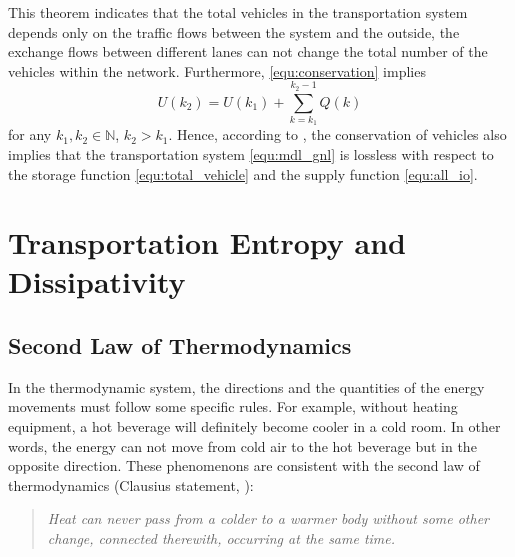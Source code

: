 \documentclass[preprint,authoryear,12pt]{elsarticle}
\begin{document}
This theorem indicates that the total vehicles in the transportation
system depends only on the traffic flows between the system and the
outside, the exchange flows between different lanes can not change
the total number of the vehicles within the network. Furthermore,
\eqref{equ:conservation} implies
\begin{equation}\label{equ:conservation_ex}
U(k_2) = U(k_1)+\sum_{k=k_1}^{k_2-1}Q(k)
\end{equation}
for any $k_1,k_2\in\mathbb{N}$, $k_2>k_1$. Hence, according to
\citep{willems_dissipative_1972-1}, the conservation of vehicles also
implies that the transportation system \eqref{equ:mdl_gnl} is
lossless with respect to the storage function
\eqref{equ:total_vehicle} and the supply function \eqref{equ:all_io}.

\section{Transportation Entropy and Dissipativity}\label{sec:entropy}

\subsection{Second Law of Thermodynamics}

In the thermodynamic system, the directions and the quantities of the
energy movements must follow some specific rules. For example,
without heating equipment, a hot beverage will definitely become
cooler in a cold room. In other words, the energy can not move from
cold air to the hot beverage but in the opposite direction. These
phenomenons are consistent with the second law of thermodynamics
(Clausius statement, \citet{clausius_mechanical_1867}):
\begin{quotation}
\it Heat can never pass from a colder to a warmer body without some
other change, connected therewith, occurring at the same time.
\end{quotation}
\end{document}
